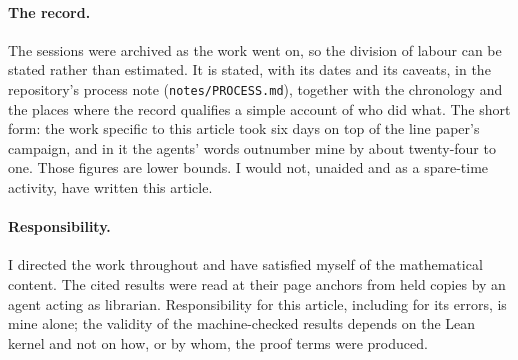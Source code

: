 \paragraph{The record.} The sessions were archived as the work went on, so the division of
labour can be stated rather than estimated. It is stated, with its dates and its caveats, in
the repository's process note (\texttt{notes/PROCESS.md}), together with the chronology and
the places where the record qualifies a simple account of who did what. The short form: the
work specific to this article took six days on top of the line paper's campaign, and in it
the agents' words outnumber mine by about twenty-four to one. Those figures are lower bounds.
I would not, unaided and as a spare-time activity, have written this article.

\paragraph{Responsibility.} I directed the work throughout and have satisfied myself of the
mathematical content. The cited results were read at their page anchors from held copies by an
agent acting as librarian. Responsibility for this article, including for its errors, is mine
alone; the validity of the machine-checked results depends on the Lean kernel and not on how,
or by whom, the proof terms were produced.
